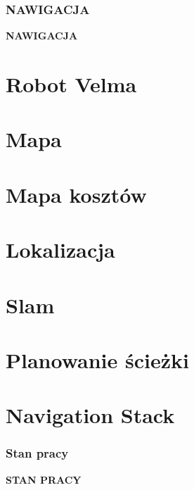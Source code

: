 \documentclass[aspectratio=169,11pt]{beamer}
\begin{document}
{
\begin{frame}
\frametitle{NAWIGACJA}
	\begin{center}
		\LARGE{\textbf{NAWIGACJA}}
	\end{center}
\end{frame}
}

\section{Robot Velma}


\section{Mapa}


\section{Mapa kosztów}


\section{Lokalizacja}


\section{Slam}


\section{Planowanie ścieżki}


\section{Navigation Stack}


{
\begin{frame}
\frametitle{Stan pracy}
	\begin{center}
		\LARGE{\textbf{STAN PRACY}}
	\end{center}
\end{frame}
}
\end{document}
